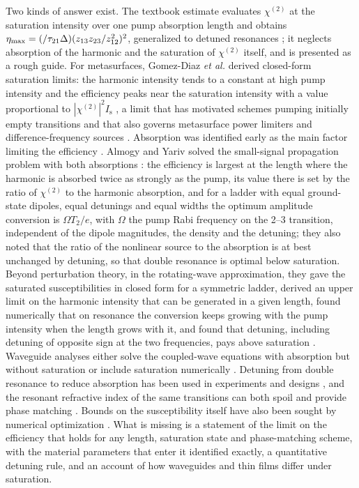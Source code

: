 \documentclass[11pt]{article}
\newcommand{\chitwo}{\chi^{(2)}}
\newcommand{\Is}{I_\mathrm{s}}
\let\hbar\relax\DeclareRobustCommand{\hbar}{{\mathchar'26\mkern-9mu h}}
\begin{document}
Two kinds of answer exist. The textbook estimate evaluates $\chitwo$ at the saturation intensity over one pump absorption length and obtains $\eta_\mathrm{max}=(\hbar/\tau_{21}\Delta)(z_{13}z_{23}/z_{12}^2)^2$, generalized to detuned resonances \cite{Vurgaftman2021}; it neglects absorption of the harmonic and the saturation of $\chitwo$ itself, and is presented as a rough guide. For metasurfaces, Gomez-Diaz \emph{et al.} derived closed-form saturation limits: the harmonic intensity tends to a constant at high pump intensity and the efficiency peaks near the saturation intensity with a value proportional to $|\chitwo|^2\Is$ \cite{GomezDiaz2015}, a limit that has motivated schemes pumping initially empty transitions \cite{Nefedkin2022,Krakofsky2023} and that also governs metasurface power limiters and difference-frequency sources \cite{Mann2021,Cotrufo2024,Krakofsky2026}. Absorption was identified early as the main factor limiting the efficiency \cite{Khurgin1989}. Almogy and Yariv solved the small-signal propagation problem with both absorptions \cite{Almogy1994,AlmogyThesis1995}: the efficiency is largest at the length where the harmonic is absorbed twice as strongly as the pump, its value there is set by the ratio of $\chitwo$ to the harmonic absorption, and for a ladder with equal ground-state dipoles, equal detunings and equal widths the optimum amplitude conversion is $\Omega T_2/e$, with $\Omega$ the pump Rabi frequency on the 2--3 transition, independent of the dipole magnitudes, the density and the detuning; they also noted that the ratio of the nonlinear source to the absorption is at best unchanged by detuning, so that double resonance is optimal below saturation. Beyond perturbation theory, in the rotating-wave approximation, they gave the saturated susceptibilities in closed form for a symmetric ladder, derived an upper limit on the harmonic intensity that can be generated in a given length, found numerically that on resonance the conversion keeps growing with the pump intensity when the length grows with it, and found that detuning, including detuning of opposite sign at the two frequencies, pays above saturation \cite{AlmogyLEOS1994,AlmogyQELS1995,Almogy1995JNOPM,AlmogyThesis1995}. Waveguide analyses either solve the coupled-wave equations with absorption but without saturation \cite{Chesi2023,TalamasSimola2024,DeLeonardis2022} or include saturation numerically \cite{Vurgaftman1996,VurgaftmanNLO1996,Almogy1994,Kocinac2001}. Detuning from double resonance to reduce absorption has been used in experiments and designs \cite{Vodopyanov1998,Vurgaftman1996SSC,TalamasSimola2024}, and the resonant refractive index of the same transitions can both spoil and provide phase matching \cite{AlmogyOL1994PM}. Bounds on the susceptibility itself have also been sought by numerical optimization \cite{Goldoni2001}. What is missing is a statement of the limit on the efficiency that holds for any length, saturation state and phase-matching scheme, with the material parameters that enter it identified exactly, a quantitative detuning rule, and an account of how waveguides and thin films differ under saturation.
\end{document}
